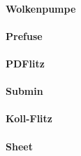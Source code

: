 \documentclass[11pt,a4paper]{article}
\begin{document}
\paragraph{Wolkenpumpe}

\paragraph{Prefuse}

\paragraph{PDFlitz}

\paragraph{Submin}

\paragraph{Koll-Flitz}

\paragraph{Sheet}

\printbibliography
\end{document}
